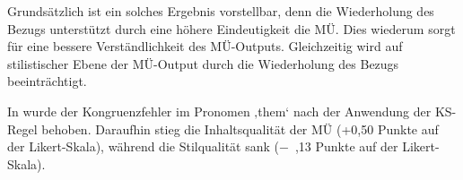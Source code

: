 \begin{figure}



















\captionsetup{width=.45\textwidth}
\begin{floatrow}
\end{floatrow}

\end{figure}

Grundsätzlich ist ein solches Ergebnis vorstellbar, denn die Wiederholung des Bezugs unterstützt durch eine höhere Eindeutigkeit die MÜ. Dies wiederum sorgt für eine bessere Verständlichkeit des MÜ-Outputs. Gleichzeitig wird auf stilistischer Ebene der MÜ-Output durch die Wiederholung des Bezugs beeinträchtigt.

In  wurde der Kongruenzfehler im Pronomen ‚them‘ nach der Anwendung der KS-Regel behoben. Daraufhin stieg die Inhaltsqualität der MÜ (+0,50 Punkte auf der Likert-Skala), während die Stilqualität sank ($-$~,13 Punkte auf der Likert-Skala).


